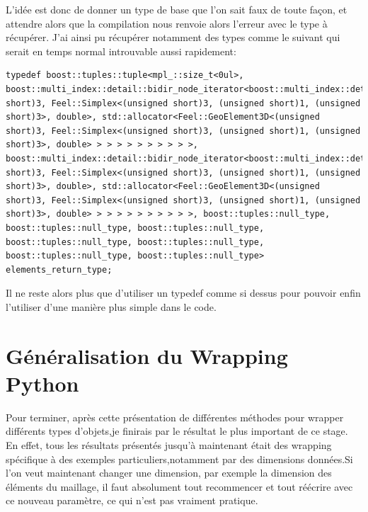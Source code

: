 \documentclass[french,12pt]{article}
\begin{document}
L'idée est donc de donner un type de base que l'on sait faux de toute façon, et attendre alors que la compilation nous renvoie alors l'erreur avec le type à récupérer. J'ai ainsi pu récupérer notamment des types comme le suivant qui serait en temps normal introuvable aussi rapidement:

\begin{lstlisting}
typedef boost::tuples::tuple<mpl_::size_t<0ul>, boost::multi_index::detail::bidir_node_iterator<boost::multi_index::detail::ordered_index_node<boost::multi_index::detail::ordered_index_node<boost::multi_index::detail::ordered_index_node<boost::multi_index::detail::ordered_index_node<boost::multi_index::detail::ordered_index_node<boost::multi_index::detail::ordered_index_node<boost::multi_index::detail::ordered_index_node<boost::multi_index::detail::index_node_base<Feel::GeoElement3D<(unsigned short)3, Feel::Simplex<(unsigned short)3, (unsigned short)1, (unsigned short)3>, double>, std::allocator<Feel::GeoElement3D<(unsigned short)3, Feel::Simplex<(unsigned short)3, (unsigned short)1, (unsigned short)3>, double> > > > > > > > > > >, boost::multi_index::detail::bidir_node_iterator<boost::multi_index::detail::ordered_index_node<boost::multi_index::detail::ordered_index_node<boost::multi_index::detail::ordered_index_node<boost::multi_index::detail::ordered_index_node<boost::multi_index::detail::ordered_index_node<boost::multi_index::detail::ordered_index_node<boost::multi_index::detail::ordered_index_node<boost::multi_index::detail::index_node_base<Feel::GeoElement3D<(unsigned short)3, Feel::Simplex<(unsigned short)3, (unsigned short)1, (unsigned short)3>, double>, std::allocator<Feel::GeoElement3D<(unsigned short)3, Feel::Simplex<(unsigned short)3, (unsigned short)1, (unsigned short)3>, double> > > > > > > > > > >, boost::tuples::null_type, boost::tuples::null_type, boost::tuples::null_type, boost::tuples::null_type, boost::tuples::null_type, boost::tuples::null_type, boost::tuples::null_type> elements_return_type; 
\end{lstlisting}

Il ne reste alors plus que d'utiliser un typedef comme si dessus pour pouvoir enfin l'utiliser d'une manière plus simple dans le code.

\section{Généralisation du Wrapping Python}

Pour terminer, après cette présentation de différentes méthodes pour wrapper différents types d'objets,je finirais par le résultat le plus important de ce stage.
En effet, tous les résultats présentés jusqu'à maintenant était des wrapping spécifique à des exemples particuliers,notamment par des dimensions données.Si l'on veut maintenant changer une dimension, par exemple la dimension des éléments du maillage, il faut absolument tout recommencer et tout réécrire avec ce nouveau paramètre, ce qui n'est pas vraiment pratique.
\end{document}
